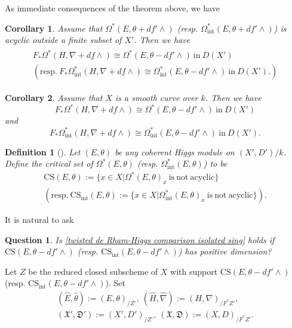 \documentclass[12pt, a4paper]{article}
\newtheorem{definition}{Definition}[section]
\newtheorem{question}{Question}[section]
\newtheorem{corollary}{Corollary}[section]
\begin{document}
As immediate consequences of the theorem above, we have
\begin{corollary}\label{C1}
Assume that $\Omega^*(E,\theta+df'\wedge)$ (resp. $\Omega_\mathrm{int}^*(E,\theta+df'\wedge)$) is acyclic outside a finite subset of $X'$. Then we have 
\begin{eqnarray}\label{twisted de Rham-Higgs comparison isolated sing}
\begin{array}{c}
F_*\Omega^*(H,\nabla+df\wedge)\cong\Omega^*(E,\theta-df'\wedge)~\mathrm{in}~D(X')\\
(\mathrm{resp.}~F_*\Omega_\mathrm{int}^*(H,\nabla+df\wedge)\cong\Omega_\mathrm{int}^*(E,\theta-df'\wedge)~\mathrm{in}~D(X').)
\end{array}
\end{eqnarray}
\end{corollary}
\begin{corollary}
Assume that $X$ is a smooth curve over $k$. Then we have 
$$
F_*\Omega^*(H,\nabla+df\wedge)\cong\Omega^*(E,\theta-df'\wedge)~\mathrm{in}~D(X')
$$
and
$$
F_*\Omega_\mathrm{int}^*(H,\nabla+df\wedge)\cong\Omega_\mathrm{int}^*(E,\theta-df'\wedge)~\mathrm{in}~D(X').
$$
\end{corollary}
\begin{definition}[{\cite[Definition 2.3.2]{Ogus04}}]
Let $(E,\theta)$ be any coherent Higgs module on $(X',D')/k$. Define the critical set of $\Omega^*(E,\theta)$ (resp. $\Omega_\mathrm{int}^*(E,\theta)$) to be
$$
\begin{array}{c}
\mathrm{CS}(E,\theta):=\{x\in X|\Omega^*(E,\theta)_x~\mathrm{is}~\mathrm{not}~\mathrm{acyclic}\}\\
(\mathrm{resp.}~\mathrm{CS}_\mathrm{int}(E,\theta):=\{x\in X|\Omega_\mathrm{int}^*(E,\theta)_x~\mathrm{is}~\mathrm{not}~\mathrm{acyclic}\}).
\end{array}
$$
\end{definition}
It is natural to ask
\begin{question}\label{question}
Is \eqref{twisted de Rham-Higgs comparison isolated sing} holds if $\mathrm{CS}(E,\theta-df'\wedge)$ (resp. $\mathrm{CS}_\mathrm{int}(E,\theta-df'\wedge)$) has positive dimension?
\end{question}
 Let $Z$ be the reduced closed subscheme of $X$ with support $\mathrm{CS}(E,\theta-df'\wedge)$ (resp. $\mathrm{CS}_\mathrm{int}(E,\theta-df'\wedge)$). Set 
 $$
 \begin{array}{c}
 (\hat E,\hat\theta):=(E,\theta)_{/Z'},~(\hat H,\hat\nabla):=(H,\nabla)_{/F^*Z'},\\
 (\mathfrak X',\mathfrak D'):=(X',D')_{/Z'},~(\mathfrak X,\mathfrak D):=(X,D)_{/F^*Z'}.
 \end{array}
 $$
\end{document}
